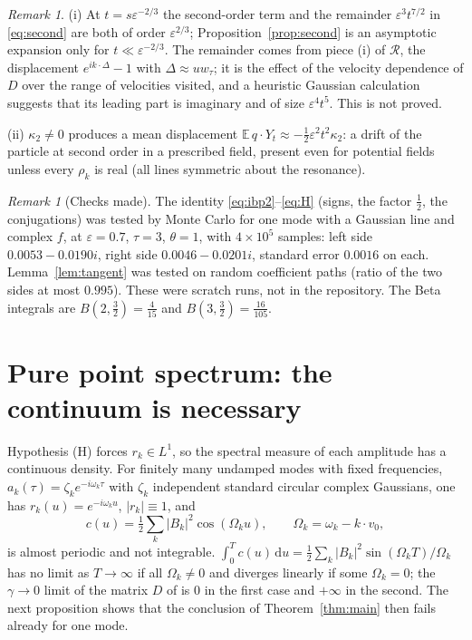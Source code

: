 \documentclass[11pt]{article}
\newcommand{\dd}{\mathrm{d}}
\newcommand{\E}{\mathbb{E}}
\newcommand{\eps}{\varepsilon}
\newcommand{\cR}{\mathcal{R}}
\theoremstyle{remark}
\newtheorem{remark}[theorem]{Remark}
\begin{document}
\begin{remark}\label{rem:second}
(i) At $t = s\eps^{-2/3}$ the second-order term and the remainder
$\eps^3t^{7/2}$ in \eqref{eq:second} are both of order $\eps^{2/3}$;
Proposition~\ref{prop:second} is an asymptotic expansion only for
$t\ll\eps^{-2/3}$. The remainder comes from piece (i) of $\cR$, the
displacement $e^{ik\cdot\Delta}-1$ with $\Delta\approx uw_\tau$; it is the
effect of the velocity dependence of $D$ over the range of velocities
visited, and a heuristic Gaussian calculation suggests that its leading part
is imaginary and of size $\eps^4t^5$. This is not proved.

(ii) $\kappa_2\ne0$ produces a mean displacement
$\E\,q\cdot Y_t\approx-\frac12\eps^2t^2\kappa_2$: a drift of the particle at
second order in a prescribed field, present even for potential fields
unless every $\rho_k$ is real (all lines symmetric about the resonance).
\end{remark}

\begin{remark}[Checks made]\label{rem:checks}
The identity \eqref{eq:ibp2}--\eqref{eq:H} (signs, the factor $\frac12$, the
conjugations) was tested by Monte Carlo for one mode with a Gaussian line
and complex $f$, at $\eps=0.7$, $\tau=3$, $\theta=1$, with $4\times10^5$
samples: left side $0.0053-0.0190i$, right side $0.0046-0.0201i$, standard
error $0.0016$ on each. Lemma~\ref{lem:tangent} was tested on random
coefficient paths (ratio of the two sides at most $0.995$). These were
scratch runs, not in the repository. The Beta integrals are
$B(2,\frac32) = \frac4{15}$ and $B(3,\frac32) = \frac{16}{105}$.
\end{remark}

\section{Pure point spectrum: the continuum is necessary}
\label{sec:pp}

Hypothesis (H) forces $r_k\in L^1$, so the spectral measure of each
amplitude has a continuous density. For finitely many undamped modes with
fixed frequencies, $a_k(\tau) = \zeta_ke^{-i\omega_k\tau}$ with $\zeta_k$
independent standard circular complex Gaussians, one has
$r_k(u) = e^{-i\omega_ku}$, $|r_k|\equiv1$, and
\[
  c(u) = \tfrac12\sum_k|B_k|^2\cos(\Omega_ku),\qquad\Omega_k = \omega_k-k\cdot v_0 ,
\]
is almost periodic and not integrable. $\int_0^Tc(u)\,\dd u
= \frac12\sum_k|B_k|^2\sin(\Omega_kT)/\Omega_k$ has no limit as $T\to\infty$
if all $\Omega_k\ne0$ and diverges linearly if some $\Omega_k = 0$; the
$\gamma\to0$ limit of the matrix $D$ of \cite{Note} is $0$ in the first
case and $+\infty$ in the second. The next proposition shows that the
conclusion of Theorem~\ref{thm:main} then fails already for one mode.
\end{document}
